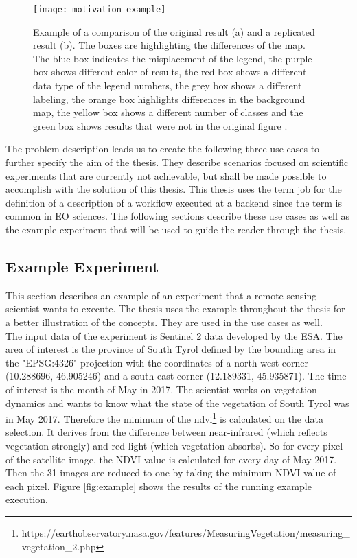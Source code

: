 \documentclass[draft,final]{vutinfth} %
\begin{document}
\begin{figure}[h]
	\centering
	\texttt{[image: motivation\_example]}
	\caption{Example of a comparison of the original result (a) and a replicated result (b). The boxes are highlighting the differences of the map. The blue box indicates the misplacement of the legend, the purple box shows different color of results, the red box shows a different data type of the legend numbers, the grey box shows a different labeling, the orange box highlights differences in the background map, the yellow box shows a different number of classes and the green box shows results that were not in the original figure \cite{Thestateofreproducibility}.}
	\label{fig:motivation} %
\end{figure} 

The problem description leads us to create the following three use cases to further specify the aim of the thesis. They describe scenarios focused on scientific experiments that are currently not achievable, but shall be made possible to accomplish with the solution of this thesis. This thesis uses the term \gls{job} for the definition of a description of a workflow executed at a backend since the term is common in EO sciences. The following sections describe these use cases as well as the example experiment that will be used to guide the reader through the thesis.  

\subsection{Example Experiment}\label{example}

This section describes an example of an experiment that a remote sensing scientist wants to execute. The thesis uses the example throughout the thesis for a better illustration of the concepts. They are used in the use cases as well. \\
The input data of the experiment is Sentinel 2 data developed by the ESA. The area of interest is the province of South Tyrol defined by the bounding area in the "EPSG:4326" projection with the coordinates of a north-west corner (10.288696, 46.905246) and a south-east corner (12.189331, 45.935871). The time of interest is the month of May in 2017. The scientist works on vegetation dynamics and wants to know what the state of the vegetation of South Tyrol was in May 2017. Therefore the minimum of the  \gls{ndvi}\footnote{https://earthobservatory.nasa.gov/features/MeasuringVegetation/measuring\_vegetation\_2.php} is calculated on the data selection. It derives from the difference between near-infrared (which reflects vegetation strongly) and red light (which vegetation absorbs). So for every pixel of the satellite image, the NDVI value is calculated for every day of May 2017. Then the 31 images are reduced to one by taking the minimum NDVI value of each pixel. Figure \ref{fig:example} shows the results of the running example execution.\\
\end{document}
